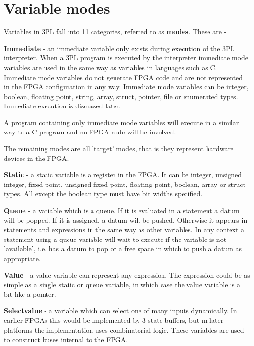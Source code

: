\documentclass[10pt,a4paper,twoside,fleqn]{article}
\newcommand{\kwd}[1]{{\bf #1}} %
\begin{document}
\section{Variable modes}

    Variables in 3PL fall into 11 categories, referred to as {\bf modes}. These are -
    
    \kwd{Immediate} - an immediate variable only exists during execution of the 3PL interpreter.
    When a 3PL program is executed by the interpreter immediate mode variables are
    used in the same way as variables in languages such as C. Immediate mode variables
    do not generate FPGA code and are not represented in the FPGA configuration in any way.
    Immediate mode variables can be integer, boolean, floating point, string, array,
    struct, pointer, file or enumerated types. Immediate execution is discussed later.
    
    A program containing only immediate mode variables will execute in a similar way to
    a C program and no FPGA code will be involved.
    
    The remaining modes are all 'target' modes, that is they represent hardware devices
    in the FPGA.
    
    \kwd{Static} - a static variable is a register in the FPGA. It can be integer, unsigned
    integer, fixed point, unsigned fixed point, floating point, boolean, array or struct
    types. All except the boolean type must have bit widths specified.
    
    \kwd{Queue} - a variable which is a queue. If it is evaluated in a statement a datum
    will be popped. If it is assigned, a datum will be pushed. Otherwise it appears in
    statements and expressions in the same way as other variables. In any context a
    statement using a queue variable will wait to execute if the variable is not
    'available', i.e. has a datum to pop or a free space in which to push a datum as
    appropriate.
    
    \kwd{Value} - a value variable can represent any expression. The expression could be
    as simple as a single static or queue variable, in which case the value variable is a bit
    like a pointer.
    
    \kwd{Selectvalue} - a variable which can select one of many inputs dynamically. In earlier
    FPGAs this would be implemented by 3-state buffers, but in later platforms the
    implementation uses combinatorial logic. These variables are used to construct buses
    internal to the FPGA.
    
\end{document}
